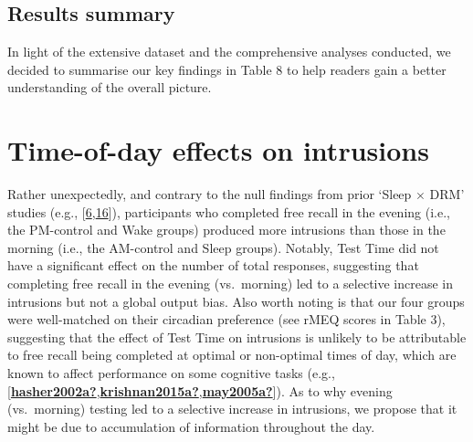 \documentclass[
]{article}
\begin{document}
\hypertarget{results-summary}{%
\subsection{Results summary}\label{results-summary}}

In light of the extensive dataset and the comprehensive analyses conducted, we decided to summarise our key findings in Table 8 to help readers gain a better understanding of the overall picture.

\hypertarget{time-of-day-effects-on-intrusions}{%
\section{Time-of-day effects on intrusions}\label{time-of-day-effects-on-intrusions}}

Rather unexpectedly, and contrary to the null findings from prior `Sleep \(\times\) DRM' studies (e.g., {[}\protect\hyperlink{ref-payne2009a}{6},\protect\hyperlink{ref-mckeon2012a}{16}{]}), participants who completed free recall in the evening (i.e., the PM-control and Wake groups) produced more intrusions than those in the morning (i.e., the AM-control and Sleep groups). Notably, Test Time did not have a significant effect on the number of total responses, suggesting that completing free recall in the evening (vs.~morning) led to a selective increase in intrusions but not a global output bias. Also worth noting is that our four groups were well-matched on their circadian preference (see rMEQ scores in Table 3), suggesting that the effect of Test Time on intrusions is unlikely to be attributable to free recall being completed at optimal or non-optimal times of day, which are known to affect performance on some cognitive tasks (e.g., {[}\protect\hyperlink{ref-hasher2002a}{\textbf{hasher2002a?}},\protect\hyperlink{ref-krishnan2015a}{\textbf{krishnan2015a?}},\protect\hyperlink{ref-may2005a}{\textbf{may2005a?}}{]}). As to why evening (vs.~morning) testing led to a selective increase in intrusions, we propose that it might be due to accumulation of information throughout the day.
\end{document}
